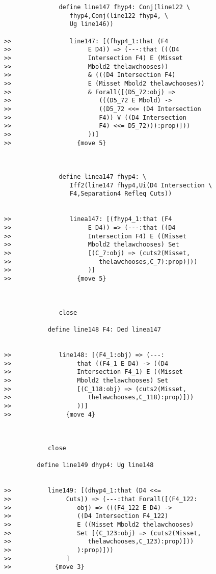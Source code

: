\documentclass[12pt]{article}
\begin{document}
\begin{verbatim}
               define line147 fhyp4: Conj(line122 \
                  fhyp4,Conj(line122 fhyp4, \
                  Ug line146))

>>                line147: [(fhyp4_1:that (F4
>>                     E D4)) => (---:that (((D4
>>                     Intersection F4) E (Misset
>>                     Mbold2 thelawchooses))
>>                     & (((D4 Intersection F4)
>>                     E (Misset Mbold2 thelawchooses))
>>                     & Forall([(D5_72:obj) =>
>>                        (((D5_72 E Mbold) ->
>>                        ((D5_72 <<= (D4 Intersection
>>                        F4)) V ((D4 Intersection
>>                        F4) <<= D5_72))):prop)]))
>>                     ))]
>>                  {move 5}



               define linea147 fhyp4: \
                  Iff2(line147 fhyp4,Ui(D4 Intersection \
                  F4,Separation4 Refleq Cuts))


>>                linea147: [(fhyp4_1:that (F4
>>                     E D4)) => (---:that ((D4
>>                     Intersection F4) E ((Misset
>>                     Mbold2 thelawchooses) Set
>>                     [(C_7:obj) => (cuts2(Misset,
>>                        thelawchooses,C_7):prop)]))
>>                     )]
>>                  {move 5}



               close

            define line148 F4: Ded linea147


>>             line148: [(F4_1:obj) => (---:
>>                  that ((F4_1 E D4) -> ((D4
>>                  Intersection F4_1) E ((Misset
>>                  Mbold2 thelawchooses) Set
>>                  [(C_118:obj) => (cuts2(Misset,
>>                     thelawchooses,C_118):prop)]))
>>                  ))]
>>               {move 4}



            close

         define line149 dhyp4: Ug line148


>>          line149: [(dhyp4_1:that (D4 <<=
>>               Cuts)) => (---:that Forall([(F4_122:
>>                  obj) => (((F4_122 E D4) ->
>>                  ((D4 Intersection F4_122)
>>                  E ((Misset Mbold2 thelawchooses)
>>                  Set [(C_123:obj) => (cuts2(Misset,
>>                     thelawchooses,C_123):prop)]))
>>                  ):prop)]))
>>               ]
>>            {move 3}




\end{verbatim}
\end{document}

